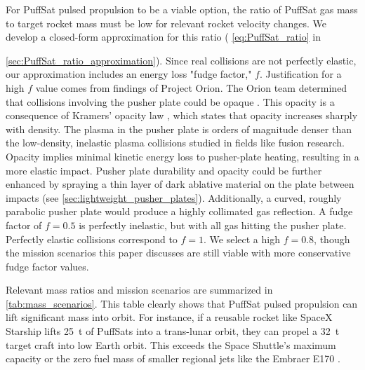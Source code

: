 \documentclass{article}
\begin{document}
For PuffSat pulsed propulsion to be a viable option, the ratio of PuffSat gas mass to target rocket mass must be low for relevant rocket velocity changes. We develop a closed-form approximation for this ratio ( \autoref{eq:PuffSat_ratio} in {\autoref{sec:PuffSat_ratio_approximation}). Since real collisions are not perfectly elastic, our approximation includes an energy loss "fudge factor," $f$.  Justification for a high $f$ value comes from findings of Project Orion. The Orion team determined that collisions involving the pusher plate could be opaque  \cite{orion_reflections}. This opacity is a consequence of Kramers' opacity law \cite{kramers1928diffusion}, which states that opacity increases sharply with density. The plasma in the pusher plate is orders of magnitude denser than the low-density, inelastic plasma collisions studied in fields like fusion research.  Opacity implies minimal kinetic energy loss to pusher-plate heating, resulting in a more elastic impact. Pusher plate durability and opacity could be further enhanced by spraying a thin layer of dark ablative material  on the plate between impacts (see \autoref{sec:lightweight_pusher_plates}).   Additionally, a curved, roughly parabolic pusher plate would produce a  highly collimated gas reflection. A fudge factor of $f=0.5$ is perfectly inelastic, but with all gas hitting the pusher plate. Perfectly elastic collisions correspond to $f=1$.  We select a high $f=0.8$, though the mission scenarios this paper discusses are still viable with more conservative fudge factor values.   

Relevant mass ratios and mission scenarios are summarized in \autoref{tab:mass_scenarios}. This table clearly shows that PuffSat pulsed propulsion can lift significant mass into orbit. For instance, if a reusable rocket like SpaceX Starship \cite{starship} lifts \SI{25}{\tonne} of PuffSats into a trans-lunar orbit, they can propel a  \SI{32}{\tonne} target craft into low Earth orbit. This exceeds the Space Shuttle's maximum capacity \cite{space_shuttle_program} or the zero fuel mass of smaller regional jets like the Embraer E170 \cite{embraer_e170}.

}
\end{document}
